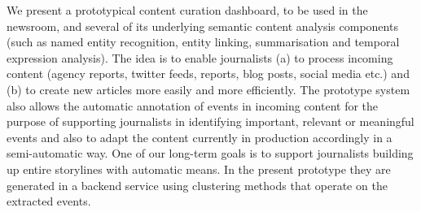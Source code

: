 We present a prototypical content curation dashboard, to be used in the newsroom, and several of its underlying semantic content analysis components (such as named entity recognition, entity linking, summarisation and temporal expression analysis). The idea is to enable journalists (a) to process incoming content (agency reports, twitter feeds, reports, blog posts, social media etc.) and (b) to create new articles more easily and more efficiently. The prototype system also allows the automatic annotation of events in incoming content for the purpose of supporting journalists in identifying important, relevant or meaningful events and also to adapt the content currently in production accordingly in a semi-automatic way. One of our long-term goals is to support journalists building up entire storylines with automatic means. In the present prototype they are generated in a backend service using clustering methods that operate on the extracted events.
